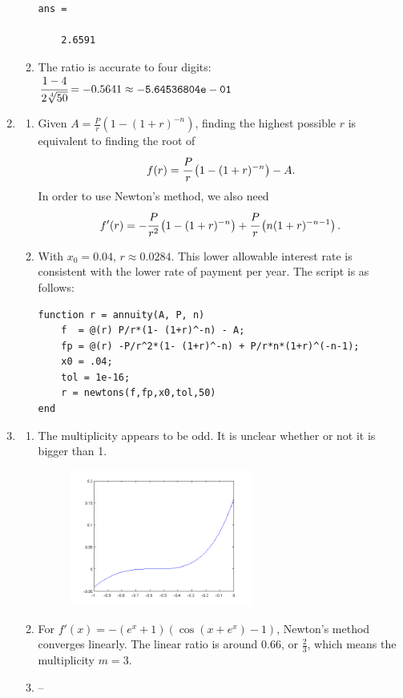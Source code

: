 \documentclass[12pt,letterpaper]{article}
\begin{document}
\begin{enumerate}
\begin{enumerate}
{\begin{verbatim}
ans =

    2.6591
          \end{verbatim}
        }

      \item The ratio is accurate to four digits: $\cfrac{1-4}{2\sqrt[4]{50}} = -0.5641 \approx {\tt -5.64536804e-01}$
    \end{enumerate}

  \item
    \begin{enumerate}
      \item Given $A = \frac{P}{r}(1-(1+r)^{-n})$, finding the highest possible
        $r$ is equivalent to finding the root of
        \[f(r) = \cfrac{P}{r}\left(1-(1+r)^{-n}\right) - A.\]
        In order to use Newton's method, we also need
        \[f'(r) = -\cfrac{P}{r^2}\left(1-(1+r)^{-n}\right) + \cfrac{P}{r}\left(n(1+r)^{-n-1}\right).\]

      \item With $x_0 = 0.04$, $\boxed{r \approx 0.0284}$. This lower allowable
        interest rate is consistent with the lower rate of payment per year.
        The script is as follows:
        {\footnotesize
          \begin{verbatim}
function r = annuity(A, P, n)
    f  = @(r) P/r*(1- (1+r)^-n) - A;
    fp = @(r) -P/r^2*(1- (1+r)^-n) + P/r*n*(1+r)^(-n-1);
    x0 = .04;
    tol = 1e-16;
    r = newtons(f,fp,x0,tol,50)
end
          \end{verbatim}
        }
    \end{enumerate}

  \item
    \begin{enumerate}
      \item The multiplicity appears to be odd. It is unclear whether or not it
        is bigger than 1.
        \begin{figure}[!h]
          \centering
          \includegraphics[width=0.6\textwidth]{3a.png}
        \end{figure}

      \item For $f'(x) = -(e^x+1)(\cos(x+e^x)-1)$, Newton's method converges
        linearly. The linear ratio is around $0.66$, or $\frac23$, which means
        the multiplicity $m = 3$.
      \item --
    \end{enumerate}
\end{enumerate}
\end{document}
